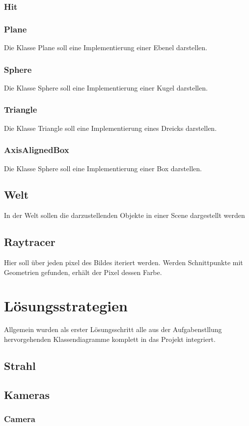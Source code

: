 \documentclass[14pt]{extarticle}
\begin{document}
\subsubsection{Hit}
\subsubsection{Plane}
Die Klasse Plane soll eine Implementierung einer Ebenel darstellen. 
\subsubsection{Sphere}
Die Klasse Sphere soll eine Implementierung einer Kugel darstellen. 
\subsubsection{Triangle}
Die Klasse Triangle soll eine Implementierung eines Dreicks darstellen. 
\subsubsection{AxisAlignedBox}
Die Klasse Sphere soll eine Implementierung einer Box darstellen. 
\subsection{Welt}
In der Welt sollen die darzustellenden Objekte in einer Scene dargestellt werden
\subsection{Raytracer}
Hier soll über jeden pixel des Bildes iteriert werden. Werden Schnittpunkte mit Geometrien gefunden, erhält der Pixel dessen Farbe.


\section{Lösungsstrategien}
Allgemein wurden als erster Lösungsschritt alle aus der Aufgabenstllung hervorgehenden Klassendiagramme komplett in das Projekt integriert.

\subsection{Strahl}
\subsection{Kameras}
\subsubsection{Camera}
\end{document}
